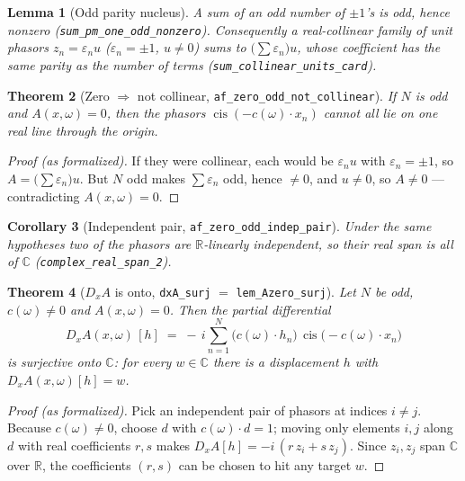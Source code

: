 \documentclass[11pt]{article}
\theoremstyle{plain}
\newtheorem{theorem}{Theorem}[section]
\newtheorem{lemma}[theorem]{Lemma}
\newtheorem{corollary}[theorem]{Corollary}
\theoremstyle{definition}
\theoremstyle{remark}
\newcommand{\RR}{\mathbb{R}}
\newcommand{\CC}{\mathbb{C}}
\newcommand{\cvec}{c}                 %
\newcommand{\Af}{A}                   %
\newcommand{\code}[1]{\texttt{\small #1}}
\DeclareMathOperator{\cis}{cis}
\begin{document}
\begin{lemma}[Odd parity nucleus]
A sum of an odd number of $\pm1$'s is odd, hence nonzero
(\code{sum\_pm\_one\_odd\_nonzero}).  Consequently a real-collinear family of
unit phasors $z_n=\varepsilon_n u$ ($\varepsilon_n=\pm1$, $u\ne0$) sums to
$\big(\sum\varepsilon_n\big)u$, whose coefficient has the same parity as the
number of terms (\code{sum\_collinear\_units\_card}).
\end{lemma}

\begin{theorem}[Zero $\Rightarrow$ not collinear, \code{af\_zero\_odd\_not\_collinear}]
If $N$ is odd and $\Af(x,\omega)=0$, then the phasors
$\cis(-\cvec(\omega)\cdot x_n)$ cannot all lie on one real line through the
origin.
\end{theorem}

\begin{proof}[Proof (as formalized)]
If they were collinear, each would be $\varepsilon_n u$ with
$\varepsilon_n=\pm1$, so $\Af=\big(\sum\varepsilon_n\big)u$.  But $N$ odd makes
$\sum\varepsilon_n$ odd, hence $\ne0$, and $u\ne0$, so $\Af\ne0$ ---
contradicting $\Af(x,\omega)=0$.
\end{proof}

\begin{corollary}[Independent pair, \code{af\_zero\_odd\_indep\_pair}]
Under the same hypotheses two of the phasors are $\RR$-linearly independent, so
their real span is all of $\CC$ (\code{complex\_real\_span\_2}).
\end{corollary}

\begin{theorem}[$D_x\Af$ is onto, \code{dxA\_surj} $=$ \code{lem\_Azero\_surj}]
\label{thm:dxa}
Let $N$ be odd, $\cvec(\omega)\ne0$ and $\Af(x,\omega)=0$.  Then the partial
differential
\[
  D_x\Af(x,\omega)\,[h]\;=\;-\,i\sum_{n=1}^N \big(\cvec(\omega)\cdot h_n\big)\,
       \cis\!\big(-\cvec(\omega)\cdot x_n\big)
\]
is surjective onto $\CC$: for every $w\in\CC$ there is a displacement $h$ with
$D_x\Af(x,\omega)[h]=w$.
\end{theorem}

\begin{proof}[Proof (as formalized)]
Pick an independent pair of phasors at indices $i\ne j$.  Because
$\cvec(\omega)\ne0$, choose $d$ with $\cvec(\omega)\cdot d=1$; moving only
elements $i,j$ along $d$ with real coefficients $r,s$ makes
$D_x\Af[h]=-i\,(r\,z_i+s\,z_j)$.  Since $z_i,z_j$ span $\CC$ over $\RR$, the
coefficients $(r,s)$ can be chosen to hit any target $w$.
\end{proof}
\end{document}
